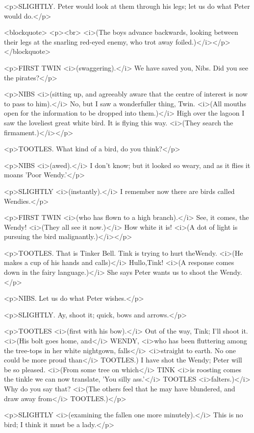<p>SLIGHTLY. Peter would look at them through his legs; let us do
what Peter would do.</p>

<blockquote>
<p><br>
 <i>(The boys advance backwards, looking between their legs at the
snarling red-eyed enemy, who trot away foiled.)</i></p>
</blockquote>

<p>FIRST TWIN <i>(swaggering).</i> We have saved you, Nibs. Did you
see the pirates?</p>

<p>NIBS <i>(sitting up, and agreeably aware that the centre of
interest is now to pass to him).</i> No, but I saw a wonderfuller
thing, Twin. <i>(All mouths open for the information to be dropped
into them.)</i> High over the lagoon I saw the loveliest great white
bird. It is flying this way. <i>(They search the firmament.)</i></p>

<p>TOOTLES. What kind of a bird, do you think?</p>

<p>NIBS <i>(awed).</i> I don't know; but it looked so weary, and as
it flies it moans 'Poor Wendy.'</p>

<p>SLIGHTLY <i>(instantly).</i> I remember now there are birds called
Wendies.</p>

<p>FIRST TWIN <i>(who has flown to a high branch).</i> See, it comes,
the Wendy! <i>(They all see it now.)</i> How white it is! <i>(A dot
of light is pursuing the bird malignantly.)</i></p>

<p>TOOTLES. That is Tinker Bell. Tink is trying to hurt theWendy.
<i>(He makes a cup of his hands and calls)</i> Hullo,Tink! <i>(A
response comes down in the fairy language.)</i> She says Peter wants
us to shoot the Wendy.</p>

<p>NIBS. Let us do what Peter wishes.</p>

<p>SLIGHTLY. Ay, shoot it; quick, bows and arrows.</p>

<p>TOOTLES <i>(first with his bow).</i> Out of the way, Tink; I'll
shoot it. <i>(His bolt goes home, and</i> WENDY, <i>who has been
fluttering among the tree-tops in her white nightgown, falls</i>
<i>straight to earth. No one could be more proud than</i> TOOTLES.) I
have shot the Wendy; Peter will be so pleased. <i>(From some tree on
which</i> TINK <i>is roosting comes the tinkle we can now translate,
'You silly ass.'</i> TOOTLES <i>falters.)</i> Why do you say that?
<i>(The others feel that he may have blundered, and draw away
from</i> TOOTLES.)</p>

<p>SLIGHTLY <i>(examining the fallen one more minutely).</i> This is
no bird; I think it must be a lady.</p>

